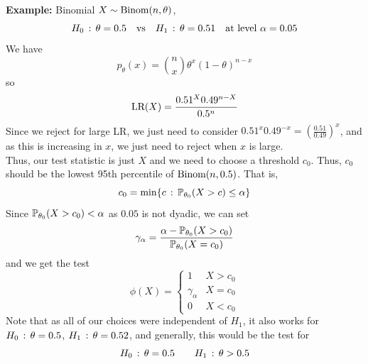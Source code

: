 \begin{example}{\textbf{Example:} Binomial}
    $X \sim \Binom(n, \theta)$,
    \[ H_0 \col \theta = 0.5 \quad \tt{vs} \quad H_1 \col \theta = 0.51 \quad \tt{at level } \alpha = 0.05 \]
    We have
    \[ p_{\theta}(x) = \binom{n}{x}\theta^{x}(1 - \theta)^{n - x} \]
    so
    \[ \tt{LR}(X) = \frac{0.51^{X}0.49^{n - X}}{0.5^{n}} \]
    Since we reject for large LR, we just need to consider $0.51^{x}0.49^{-x} = \left(\frac{0.51}{0.49}\right)^{x}$, and as this is increasing in $x$, we just need to reject when $x$ is large.\\

    Thus, our test statistic is just $X$ and we need to choose a threshold $c_0$. Thus, $c_0$ should be the lowest 95th percentile of $\Binom(n, 0.5)$. That is,
    \[ c_0 = \min\{c \col \bb{P}_{\theta_0}(X > c) \leq \alpha\} \]
    Since $\bb{P}_{\theta_0}(X > c_0) < \alpha$ as $0.05$ is not dyadic, we can set
    \[ \gamma_{\alpha} = \frac{\alpha - \bb{P}_{\theta_0}(X > c_0)}{\bb{P}_{\theta_0}(X = c_0)} \]
    and we get the test
    \[ \phi(X) = \left\{\begin{matrix} 1 & X > c_0 \\ \gamma_{\alpha} & X = c_0 \\ 0 & X < c_0 \end{matrix}\right. \]
    Note that as all of our choices were independent of $H_1$, it also works for $H_0 \col \theta = 0.5$, $H_1 \col \theta = 0.52$, and generally, this would be the test for
    \[ H_0 \col \theta = 0.5 \qquad H_1 \col \theta > 0.5 \]
\end{example}
